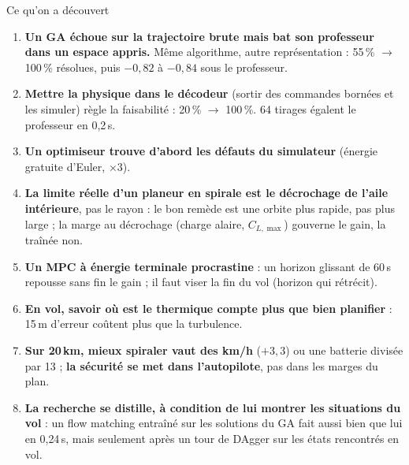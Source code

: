 \documentclass[aspectratio=169,10pt]{beamer}
\begin{document}
\begin{frame}{Ce qu'on a découvert}
  \small
  \begin{enumerate}
    \item \textbf{Un GA échoue sur la trajectoire brute mais bat son professeur dans un espace appris.} Même algorithme, autre représentation : 55\,\% $\to$ 100\,\% résolues, puis $-0{,}82$ à $-0{,}84$ sous le professeur.
    \item \textbf{Mettre la physique dans le décodeur} (sortir des commandes bornées et les simuler) règle la faisabilité : 20\,\% $\to$ 100\,\%. 64 tirages égalent le professeur en 0{,}2\,s.
    \item \textbf{Un optimiseur trouve d'abord les défauts du simulateur} (énergie gratuite d'Euler, $\times3$).
    \item \textbf{La limite réelle d'un planeur en spirale est le décrochage de l'aile intérieure}, pas le rayon : le bon remède est une orbite plus rapide, pas plus large ; la marge au décrochage (charge alaire, $C_{L,\max}$) gouverne le gain, la traînée non.
    \item \textbf{Un MPC à énergie terminale procrastine} : un horizon glissant de 60\,s repousse sans fin le gain ; il faut viser la fin du vol (horizon qui rétrécit).
    \item \textbf{En vol, savoir où est le thermique compte plus que bien planifier} : 15\,m d'erreur coûtent plus que la turbulence.
    \item \textbf{Sur 20\,km, mieux spiraler vaut des km/h} ($+3{,}3$) ou une batterie divisée par 13 ; \textbf{la sécurité se met dans l'autopilote}, pas dans les marges du plan.
    \item \textbf{La recherche se distille, à condition de lui montrer les situations du vol} : un flow matching entraîné sur les solutions du GA fait aussi bien que lui en 0{,}24\,s, mais seulement après un tour de DAgger sur les états rencontrés en vol.
  \end{enumerate}
\end{frame}
\end{document}

